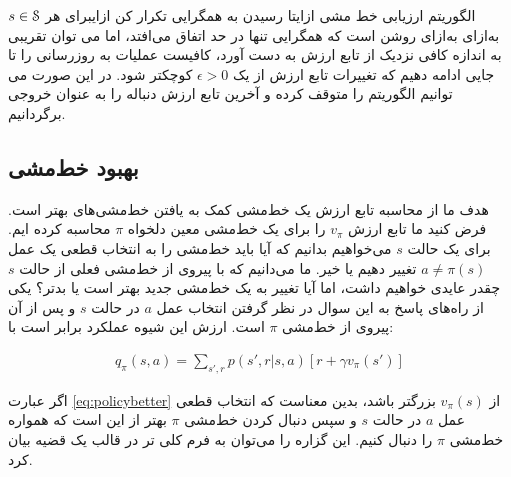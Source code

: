 {الگوریتم ارزیابی خط مشی}
‌ازای{تا رسیدن به همگرایی تکرار کن}
‌ازای{برای هر $s \in \EuScript{S}$}
‌به‌ازای
‌به‌ازای
روشن است که همگرایی تنها در حد اتفاق می‌افتد، اما می توان تقریبی به اندازه کافی نزدیک از تابع ارزش به دست آورد، کافیست عملیات به روزرسانی را تا جایی ادامه دهیم که تغییرات تابع ارزش از یک
$\epsilon > 0$
کوچکتر شود. در این صورت می توانیم الگوریتم را متوقف کرده و آخرین تابع ارزش دنباله را به عنوان خروجی برگردانیم.

% 
%

\subsection{بهبود خط‌مشی}

هدف ما از محاسبه تابع ارزش یک خط‌مشی کمک به یافتن خط‌مشی‌های بهتر است.
فرض کنید ما تابع ارزش 
$v_{\pi}$
 را برای یک خط‌مشی معین  دلخواه 
 $\pi$
  محاسبه کرده ایم. برای یک حالت 
  $s$
 می‌خواهیم بدانیم که آیا باید خط‌مشی را به انتخاب قطعی یک عمل 
 $a \neq \pi(s)$
  تغییر دهیم یا خیر.
ما می‌دانیم که با پیروی از خط‌مشی فعلی از حالت
 $s$
  چقدر عایدی خواهیم داشت، اما آیا تغییر به یک خط‌مشی جدید بهتر است یا بدتر؟
  یکی از راه‌های پاسخ به این سوال در نظر گرفتن انتخاب عمل  
  $a$
در حالت 
$s$
و پس از آن پیروی از خط‌مشی
$\pi$
 است. 
 ارزش این شیوه عملکرد برابر است با:
 
 \begin{align}
q_\pi(s,a) = \sum_{s',r} p(s',r|s,a)\left[r + \gamma v_\pi(s')\right]	
 	\label{eq:policybetter}
 \end{align}

 اگر عبارت 
 \ref{eq:policybetter}
 از $v_\pi(s)$ بزرگتر باشد، بدین معناست که انتخاب قطعی عمل $a$ در حالت $s$ و سپس دنبال کردن خط‌مشی $\pi$ بهتر از این است که همواره خط‌مشی $\pi$ را دنبال کنیم. این گزاره را می‌توان به فرم کلی تر در قالب یک قضیه بیان کرد.

